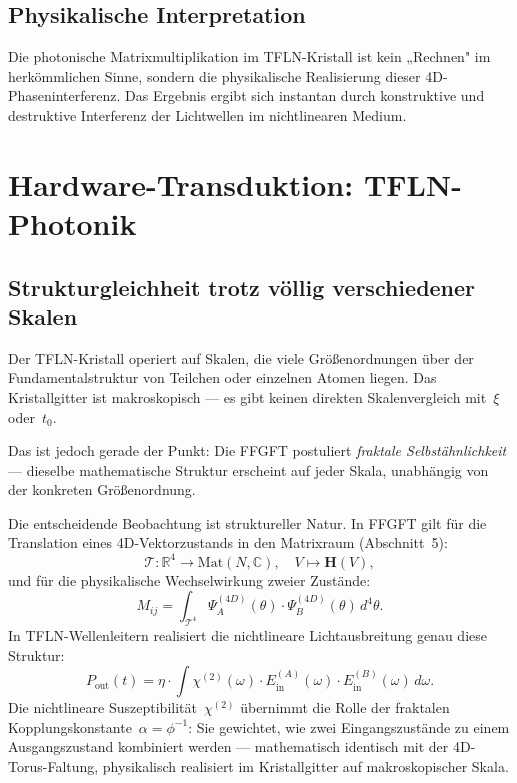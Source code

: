\subsection{Physikalische Interpretation}

Die photonische Matrixmultiplikation im TFLN-Kristall ist kein „Rechnen"
im herkömmlichen Sinne, sondern die physikalische Realisierung dieser
4D-Phaseninterferenz. Das Ergebnis ergibt sich instantan durch konstruktive
und destruktive Interferenz der Lichtwellen im nichtlinearen Medium.

\section{Hardware-Transduktion: TFLN-Photonik}

\subsection{Strukturgleichheit trotz völlig verschiedener Skalen}

\begin{warnbox}
Der TFLN-Kristall operiert auf Skalen, die viele Größenordnungen über der
Fundamentalstruktur von Teilchen oder einzelnen Atomen liegen. Das Kristallgitter
ist makroskopisch — es gibt keinen direkten Skalenvergleich mit~$\xi$ oder~$t_0$.

Das ist jedoch gerade der Punkt: Die FFGFT postuliert \emph{fraktale
Selbstähnlichkeit} — dieselbe mathematische Struktur erscheint auf jeder Skala,
unabhängig von der konkreten Größenordnung.
\end{warnbox}

Die entscheidende Beobachtung ist struktureller Natur. In FFGFT gilt für
die Translation eines 4D-Vektorzustands in den Matrixraum (Abschnitt~5):
\begin{equation}
  \mathcal{T}: \mathbb{R}^4 \to \mathrm{Mat}(N,\mathbb{C}),\quad
  V \mapsto \mathbf{H}(V),
\end{equation}
und für die physikalische Wechselwirkung zweier Zustände:
\begin{equation}
  M_{ij} = \int_{\mathcal{T}^4}
    \Psi_A^{(4D)}(\theta)\cdot\Psi_B^{(4D)}(\theta)\,d^4\theta.
\end{equation}
In TFLN-Wellenleitern realisiert die nichtlineare Lichtausbreitung
genau diese Struktur:
\begin{equation}
  P_{\text{out}}(t)
  = \eta \cdot \int \chi^{(2)}(\omega)
    \cdot E_{\text{in}}^{(A)}(\omega)
    \cdot E_{\text{in}}^{(B)}(\omega)\,d\omega.
\end{equation}
Die nichtlineare Suszeptibilität~$\chi^{(2)}$ übernimmt die Rolle der
fraktalen Kopplungskonstante~$\alpha = \phi^{-1}$: Sie gewichtet, wie
zwei Eingangszustände zu einem Ausgangszustand kombiniert werden —
mathematisch identisch mit der 4D-Torus-Faltung, physikalisch realisiert
im Kristallgitter auf makroskopischer Skala.

